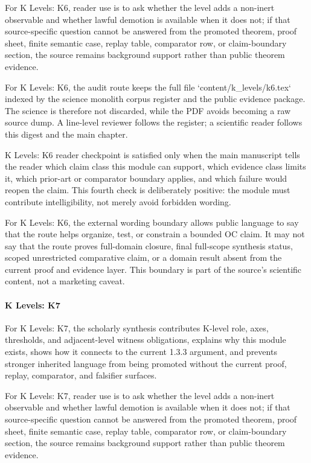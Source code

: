 For K Levels: K6, reader use is to ask whether the level adds a non-inert observable and whether lawful demotion is available when it does not; if that source-specific question cannot be answered from the promoted theorem, proof sheet, finite semantic case, replay table, comparator row, or claim-boundary section, the source remains background support rather than public theorem evidence.


For K Levels: K6, the audit route keeps the full file `content/k\_levels/k6.tex` indexed by the science monolith corpus register and the public evidence package. The science is therefore not discarded, while the PDF avoids becoming a raw source dump. A line-level reviewer follows the register; a scientific reader follows this digest and the main chapter.


K Levels: K6 reader checkpoint is satisfied only when the main manuscript tells the reader which claim class this module can support, which evidence class limits it, which prior-art or comparator boundary applies, and which failure would reopen the claim. This fourth check is deliberately positive: the module must contribute intelligibility, not merely avoid forbidden wording.


For K Levels: K6, the external wording boundary allows public language to say that the route helps organize, test, or constrain a bounded OC claim. It may not say that the route proves full-domain closure, final full-scope synthesis status, scoped unrestricted comparative claim, or a domain result absent from the current proof and evidence layer. This boundary is part of the source's scientific content, not a marketing caveat.


\paragraph{K Levels: K7}

For K Levels: K7, the scholarly synthesis contributes K-level role, axes, thresholds, and adjacent-level witness obligations, explains why this module exists, shows how it connects to the current 1.3.3 argument, and prevents stronger inherited language from being promoted without the current proof, replay, comparator, and falsifier surfaces.


For K Levels: K7, reader use is to ask whether the level adds a non-inert observable and whether lawful demotion is available when it does not; if that source-specific question cannot be answered from the promoted theorem, proof sheet, finite semantic case, replay table, comparator row, or claim-boundary section, the source remains background support rather than public theorem evidence.


